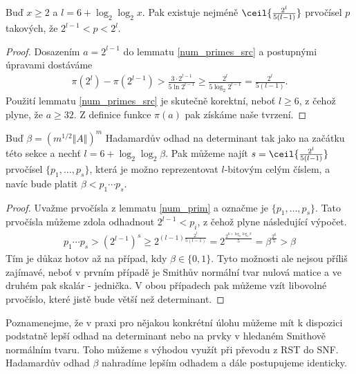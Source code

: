 \begin{lem} \label{num_prim}
Buď $ x \geq 2 $ a $ l = 6 + \log_2 \log_2 x $.
Pak existuje nejméně $ \ceil{\frac{2^{l}}{5 (l - 1)}} $ prvočísel $ p $
takových, že $ 2^{l - 1} < p < 2^l $.
\end{lem}
\begin{proof}
Dosazením $ a = 2^{l - 1} $ do lemmatu \ref{num_primes_src} a postupnými úpravami
dostáváme
\begin{align*}
    \pi(2^{l}) - \pi(2^{l - 1}) > \frac{3 \cdot 2^{l - 1}}{5 \ln{2^{l - 1}}}
                                \geq \frac{2^{l}}{5 \log_2{2^{l - 1}}}
                                = \frac{2^{l}}{5 (l - 1)}.
\end{align*}
Použití lemmatu \ref{num_primes_src} je skutečně korektní, neboť
$ l \geq 6 $, z čehož plyne, že $ a \geq 32 $. Z definice funkce $ \pi(a) $ pak
získáme naše tvrzení.
\end{proof}
\begin{dus}
Buď $ \beta = (m^{1/2} \Vert A \Vert )^m $ Hadamardův odhad na determinant tak
jako na začátku této sekce a nechť $ l = 6 + \log_2 \log_2 \beta $. Pak můžeme najít
$ s = \ceil{\frac{2^{l}}{5 (l - 1)}} $ prvočísel $ \{p_1, \dots, p_s\} $,
která je možno reprezentovat $ l $-bitovým celým číslem, a navíc bude platit
$ \beta < p_1 \cdots p_s $.
\end{dus}
\begin{proof}
Uvažme prvočísla z lemmatu \ref{num_prim} a označme je $ \{p_1, \dots, p_s\} $.
Tato prvočísla můžeme zdola odhadnout $ 2^{l - 1} < p_i $,
z čehož plyne následující výpočet.
\begin{align*}
    p_1 \cdots p_s
        > (2^{l - 1}) ^ s
        \geq 2^{(l - 1) \frac{2^l}{5 (l - 1)}}
        = 2^{\frac{2^{6 + \log_2 \log_2 \beta}}{5}}
        = \beta^{\frac{2^6}{5}} > \beta
\end{align*}
Tím je důkaz hotov až na případ, kdy $ \beta \in \{0, 1\} $. Tyto možnosti ale
nejsou příliš zajímavé, neboť v prvním případě je Smithův normální tvar nulová
matice a ve druhém pak skalár - jednička. V obou případech pak můžeme vzít
libovolné prvočíslo, které jistě bude větší než determinant.
\end{proof}

\begin{pozn}
Poznamenejme, že v praxi pro nějakou konkrétní úlohu můžeme mít k dispozici
podstatně lepší odhad na determinant nebo na prvky v hledaném Smithově normálním
tvaru. Toho můžeme s výhodou využít při převodu z RST do SNF. Hadamardův odhad
$ \beta $ nahradíme lepším odhadem a dále postupujeme identicky.
\end{pozn}

